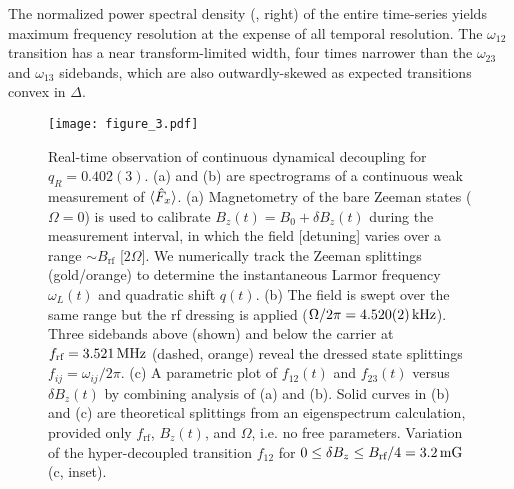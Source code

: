 \documentclass[aps,prl,reprint,superscriptaddress,floatfix]{revtex4-1}
\begin{document}
The normalized power spectral density (, right) of the entire time-series yields maximum frequency resolution at the expense of all temporal resolution.
The $\omega_{12}$ transition has a near transform-limited width, four times narrower than the $\omega_{23}$ and $\omega_{13}$ sidebands, which are also outwardly-skewed as expected transitions convex in $\Delta$. 
\begin{figure}
    \texttt{[image: figure\_3.pdf]}
    \caption{
    \label{fig:acquisition_pipeline}
        Real-time observation of continuous dynamical decoupling for $q_R = 0.402(3)$.
        (a) and (b) are spectrograms of a continuous weak measurement of $\langle \hat{F}_x \rangle$.
        (a) Magnetometry of the bare Zeeman states ($\Omega=0$) is used to calibrate $B_z(t) = B_0 + \delta B_z(t)$ during the measurement interval, in which the field [detuning] varies over a range $\sim B_{\text{rf}}$ [$2\Omega$].
        We numerically track the Zeeman splittings (gold/orange) to determine the instantaneous Larmor frequency $\omega_L(t)$ and quadratic shift $q(t)$.
       (b) The field is swept over the same range but the rf dressing is applied ($\Omega/2\pi = \unit[4.520(2)]{kHz}$).
       Three sidebands above (shown) and below the carrier at $f_{\text{rf}}=\unit[3.521]{MHz}$ (dashed, orange) reveal the dressed state splittings $f_{ij} = \omega_{ij}/2\pi$.
       (c) A parametric plot of $f_{12}(t)$ and $f_{23}(t)$ versus $\delta B_z(t)$ by combining analysis of (a) and (b).
       Solid curves in (b) and (c) are theoretical splittings from an eigenspectrum calculation, provided only $f_{\text{rf}}$, $B_z(t)$, and $\Omega$, i.e. no free parameters.
       Variation of the hyper-decoupled transition $f_{12}$ for $0 \leq \delta B_z \leq B_{\text{rf}}/4 = \unit[3.2]{mG}$ (c, inset).
    }
\end{figure}
\end{document}
